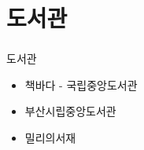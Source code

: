 \documentclass[aspectratio=1610,20pt,xcolor=pdftex,dvipsnames,table,handout]{beamer}
\begin{document}



		\section{도서관}
		\begin{frame} [t,plain]
		\frametitle{}
			\begin{block} {도서관}
			\setlength{\leftmargini}{1em}			
			\begin{itemize}
				\item 책바다 - 국립중앙도서관
				\item 부산시립중앙도서관
				\item 밀리의서재 
			\end{itemize}
			\end{block}						
		\end{frame}					

\end{document}
